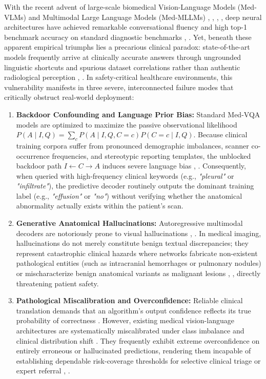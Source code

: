 \documentclass[journal,twoside,web]{ieeecolor}
\begin{document}
With the recent advent of large-scale biomedical Vision-Language Models (Med-VLMs) and Multimodal Large Language Models (Med-MLLMs) \cite{gu2021}, \cite{zhang2023}, \cite{liu2023llavamed}, \cite{wang2025chexficient}, deep neural architectures have achieved remarkable conversational fluency and high top-1 benchmark accuracy on standard diagnostic benchmarks \cite{wu2024radfm}, \cite{hashmi2025anatomix}. Yet, beneath these apparent empirical triumphs lies a precarious clinical paradox: state-of-the-art models frequently arrive at clinically accurate answers through ungrounded linguistic shortcuts and spurious dataset correlations rather than authentic radiological perception \cite{zhu2025medbiasx}, \cite{niu2021cfvqa}. In safety-critical healthcare environments, this vulnerability manifests in three severe, interconnected failure modes that critically obstruct real-world deployment:
\begin{enumerate}
    \item \textbf{Backdoor Confounding and Language Prior Bias:} Standard Med-VQA models are optimized to maximize the passive observational likelihood $P(A \mid I, Q) = \sum_c P(A \mid I, Q, C=c) P(C=c \mid I, Q)$. Because clinical training corpora suffer from pronounced demographic imbalances, scanner co-occurrence frequencies, and stereotypic reporting templates, the unblocked backdoor path $I \leftarrow C \rightarrow A$ induces severe language bias \cite{wan2025decoct}, \cite{liu2025cimb}. Consequently, when queried with high-frequency clinical keywords (e.g., \emph{"pleural"} or \emph{"infiltrate"}), the predictive decoder routinely outputs the dominant training label (e.g., \emph{"effusion"} or \emph{"no"}) without verifying whether the anatomical abnormality actually exists within the patient's scan.
    \item \textbf{Generative Anatomical Hallucinations:} Autoregressive multimodal decoders are notoriously prone to visual hallucinations \cite{medhalltune2024}, \cite{zhou2023}. In medical imaging, hallucinations do not merely constitute benign textual discrepancies; they represent catastrophic clinical hazards where networks fabricate non-existent pathological entities (such as intracranial hemorrhages or pulmonary nodules) or mischaracterize benign anatomical variants as malignant lesions \cite{liao2025vase}, \cite{chen2024vihd}, directly threatening patient safety.
    \item \textbf{Pathological Miscalibration and Overconfidence:} Reliable clinical translation demands that an algorithm's output confidence reflects its true probability of correctness \cite{guo2017}. However, existing medical vision-language architectures are systematically miscalibrated under class imbalance and clinical distribution shift \cite{sharifdeen2024mvcbench}. They frequently exhibit extreme overconfidence on entirely erroneous or hallucinated predictions, rendering them incapable of establishing dependable risk-coverage thresholds for selective clinical triage or expert referral \cite{geifman2017selective}, \cite{mozannar2020defer}.
\end{enumerate}
\end{document}
